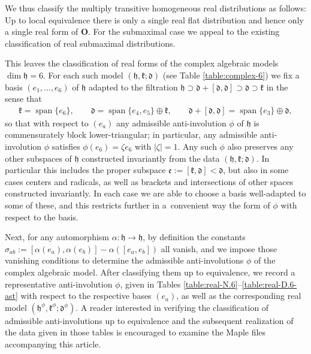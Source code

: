 \documentclass[10pt,a4paper]{amsart}
\DeclareMathOperator{\spanOperator}{span}
\newcommand{\Span}[1]{\spanOperator\{{#1}\}}
\newcommand{\mbO}{\mathbf{O}}
\newcommand{\mfd} {\mathfrak{d}}
\newcommand{\mfe} {\mathfrak{e}}
\newcommand{\mfh} {\mathfrak{h}}
\newcommand{\mfk} {\mathfrak{k}}
\numberwithin{equation}{section}
\begin{document}
We thus classify the multiply transitive homogeneous real distributions as follows: Up to local equivalence there is only a single real flat distribution and hence only a single real form of $\mbO$. For the submaximal case we appeal to the existing classification \cite[Theorem 2]{DoubrovZelenko} of real submaximal distributions.

This leaves the classification of real forms of the complex algebraic models $\dim \mfh = 6$. For each such model $(\mfh, \mfk; \mfd)$ (see Table \ref{table:complex-6}) we fix a basis $(e_1, \ldots, e_6)$ of $\mfh$ adapted to the filtration $\mfh \supset \mfd + [\mfd, \mfd] \supset \mfd \supset \mfk$ in the sense that
\begin{gather*}
	\mfk = \Span{e_6}, \qquad
	\mfd = \Span{e_4, e_5} \oplus \mfk, \qquad
	\mfd + [\mfd, \mfd] = \Span{e_3} \oplus \mfd ,
\end{gather*}
so that with respect to $(e_a)$ any admissible anti-involution $\phi$ of $\mfh$ is commensurately block lower-triangular; in particular, any admissible anti-involution $\phi$ satisfies $\phi(e_6) = \zeta e_6$ with $|\zeta| = 1$. Any such $\phi$ also preserves any other subspaces of $\mfh$ constructed invariantly from the data $(\mfh, \mfk; \mfd)$. In particular this includes the proper subspace $\mfe := [\mfk, \mfd] < \mfd$, but also in some cases centers and radicals, as well as brackets and intersections of other spaces constructed invariantly. In each case we are able to choose a basis well-adapted to some of these, and this restricts further in a~convenient way the form of $\phi$ with respect to the basis.

Next, for any automorphism $\alpha\colon \mfh \to \mfh$, by definition the constants $\sigma_{ab} := [\alpha(e_a), \alpha(e_b)] - \alpha([e_a, e_b])$ all vanish, and we impose those vanishing conditions to determine the admissible anti-involutions $\phi$ of the complex algebraic model. After classifying them up to equivalence, we record a representative anti-involution $\phi$, given in Tables \ref{table:real-N.6}--\ref{table:real-D.6-ast} with respect to the respective bases $(e_a)$, as well as the corresponding real model $(\mfh^{\phi}, \mfk^{\phi}; \mfd^{\phi})$. A reader interested in verifying the classification of admissible anti-involutions up to equivalence and the subsequent realization of the data given in those tables is encouraged to examine the Maple files accompanying %
this article.
\end{document}
